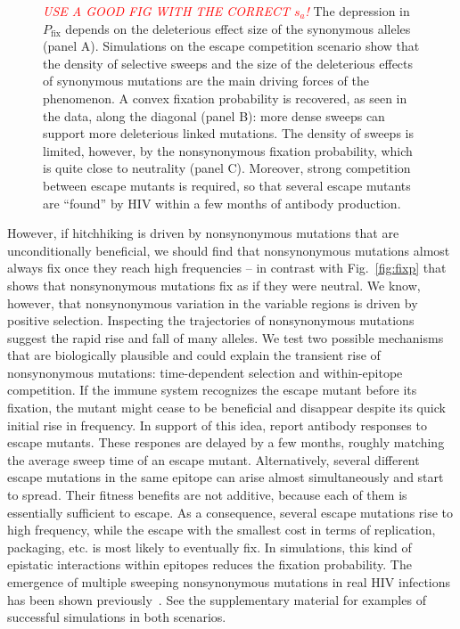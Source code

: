 \documentclass[rmp, twocolumn]{revtex4}
\newcommand{\comment}[1]{\textit{\textcolor{red}{#1}}}
\newcommand{\FIG}[1]{Fig.~\ref{fig:#1}}
\begin{document}
\begin{figure}
\begin{center}
{\label{fig:simheat2}}
\caption{\comment{USE A GOOD FIG WITH THE CORRECT $s_a$!} The depression in $P_\text{fix}$ depends on the deleterious effect size
 of the synonymous alleles (panel A). Simulations on the escape competition
 scenario show that the density of selective sweeps and the size of the
 deleterious effects of synonymous mutations are the main driving forces of the
 phenomenon. A convex fixation probability is recovered, as seen in the data,
 along the diagonal (panel B): more dense sweeps can support more deleterious
 linked mutations. The density of sweeps is limited, however, by the
 nonsynonymous fixation probability, which is quite close to neutrality (panel
 C). Moreover, strong competition between escape mutants is required, so that
 several escape mutants are ``found'' by HIV within a few months of antibody
production.}
\label{fig:simheat}
\end{center}
\end{figure}

However, if hitchhiking is driven by nonsynonymous mutations that are
unconditionally beneficial, we should find that nonsynonymous mutations almost
always fix once they reach high frequencies -- in contrast with \FIG{fixp} that
shows that nonsynonymous mutations fix as if they were neutral. We know,
however, that nonsynonymous variation in the variable regions is driven by
positive selection. Inspecting the trajectories of nonsynonymous mutations
suggest the rapid rise and fall of many alleles.  We test two possible
mechanisms that are biologically plausible and could explain the transient rise
of nonsynonymous mutations: time-dependent selection and within-epitope
competition. If the immune system recognizes the escape mutant before its
fixation, the mutant might cease to be beneficial and disappear despite its
quick initial rise in frequency.  In support of this idea,
\citet{richman_rapid_2003, bunnik_autologous_2008} report antibody responses to
escape mutants. These respones are delayed by a few months, roughly matching the
average sweep time of an escape mutant. Alternatively, several different escape
mutations in the same epitope can arise almost simultaneously and start to
spread. Their fitness benefits are not additive, because each of them is
essentially sufficient to escape. As a consequence, several escape mutations rise to
high frequency, while the escape with the smallest cost in terms of replication,
packaging, etc. is most likely to
eventually fix. In simulations, this kind of epistatic interactions within
epitopes reduces the fixation probability. The emergence of
multiple sweeping nonsynonymous mutations in real HIV infections has been shown
previously~\citep{moore_limited_2009, bar_early_2012}.
See the supplementary material for examples of successful simulations in both scenarios.
\end{document}
